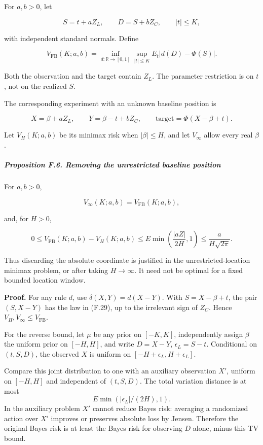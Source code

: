 For \(a,b>0\), let

\[
S=t+aZ_L,\qquad D=S+bZ_C,
\qquad |t|\le K,
\]

with independent standard normals. Define

\[
V_{\mathrm{FB}}(K;a,b)
=\inf_{d:\mathbb R\to[0,1]}
 \sup_{|t|\le K}E_t|d(D)-\Phi(S)|.
\tag{F.29}
\]

Both the observation and the target contain \(Z_L\). The parameter
restriction is on \(t\), not on the realized \(S\).

The corresponding experiment with an unknown baseline position is

\[
X=\beta+aZ_L,\qquad Y=\beta-t+bZ_C,\qquad
\text{target}=\Phi(X-\beta+t).
\tag{F.30}
\]

Let \(V_H(K;a,b)\) be its minimax risk when \(|\beta|\le H\), and let
\(V_\infty\) allow every real \(\beta\).

\subparagraph{Proposition F.6. Removing the unrestricted baseline
position}\label{proposition-f.6.-removing-the-unrestricted-baseline-position}

For \(a,b>0\),

\[
V_\infty(K;a,b)=V_{\mathrm{FB}}(K;a,b),
\tag{F.31}
\]

and, for \(H>0\),

\[
0\le V_{\mathrm{FB}}(K;a,b)-V_H(K;a,b)
\le E\min\!\left(\frac{|aZ|}{2H},1\right)
\le\frac{a}{H\sqrt{2\pi}}.
\tag{F.32}
\]

Thus discarding the absolute coordinate is justified in the
unrestricted-location minimax problem, or after taking \(H\to\infty\).
It need not be optimal for a fixed bounded location window.

\textbf{Proof.} For any rule \(d\), use \(\delta(X,Y)=d(X-Y)\). With
\(S=X-\beta+t\), the pair \((S,X-Y)\) has the law in (F.29), up to the
irrelevant sign of \(Z_C\). Hence \(V_H,V_\infty\le V_{\mathrm{FB}}\).

For the reverse bound, let \(\mu\) be any prior on \([-K,K]\),
independently assign \(\beta\) the uniform prior on \([-H,H]\), and
write \(D=X-Y\), \(\epsilon_L=S-t\). Conditional on \((t,S,D)\), the
observed \(X\) is uniform on \([-H+\epsilon_L,H+\epsilon_L]\).

Compare this joint distribution to one with an auxiliary observation
\(X'\), uniform on \([-H,H]\) and independent of \((t,S,D)\). The total
variation distance is at most \[
E\min(|\epsilon_L|/(2H),1).
\] In the auxiliary problem \(X'\) cannot reduce Bayes risk: averaging a
randomized action over \(X'\) improves or preserves absolute loss by
Jensen. Therefore the original Bayes risk is at least the Bayes risk for
observing \(D\) alone, minus this TV bound.

